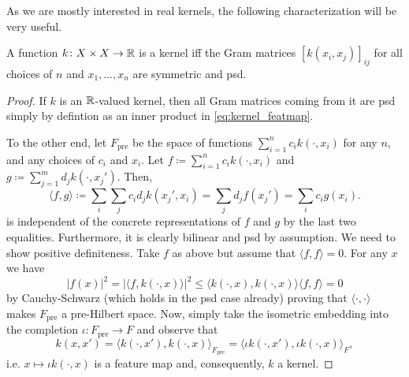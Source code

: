 As we are mostly interested in real kernels, the following 
characterization will be very useful.

\begin{lemma}
    A function $k \colon X \times X \to \mathbb{R}$ is a kernel 
    iff the Gram matrices $[k(x_i,x_j)]_{ij}$ 
    for all choices of $n$ and $x_1, \dots, x_n$
    are symmetric and psd.
\end{lemma}
\begin{proof}
    If $k$ is an $\mathbb{R}$-valued kernel, then all Gram matrices
    coming from it are psd simply by defintion as an inner 
    product in \cref{eq:kernel_featmap}.

    To the other end, let $F_{\textrm{pre}}$ be the
    space of functions $\sum_{i=1}^n c_i k(\cdot,x_i)$ for 
    any $n$, and any choices of $c_i$ and $x_i$.
    Let $f \coloneqq \sum_{i=1}^n c_i k(\cdot,x_i)$ and
    $g \coloneqq \sum_{j=1}^m d_j k(\cdot,x_j')$.
    Then, 
    \begin{equation*}
        \langle f,g \rangle \coloneqq 
            \sum_i \sum_j c_i d_j k(x_j', x_i)
            = \sum_j d_j f(x_j') = \sum_i c_i g(x_i).
    \end{equation*}
    is independent of the concrete representations of $f$ 
    and $g$ by the last two equalities.
    Furthermore, it is clearly bilinear and psd by assumption.
    We need to show positive definiteness. 
    Take $f$ as above but assume that $\langle f,f \rangle = 0$.
    For any $x$ we have 
    \begin{equation} \label{eq:firstreprprop}
        |f(x)|^2 = | \langle f, k(\cdot,x) \rangle |^2
            \leq \langle k(\cdot,x),k(\cdot,x) \rangle
            \langle f,f \rangle = 0
    \end{equation}
    by Cauchy-Schwarz (which holds in the psd case already) 
    proving that $\langle \cdot, \cdot \rangle$ makes 
    $F_{\textrm{pre}}$ a pre-Hilbert space.
    Now, simply take the isometric embedding into the completion 
    $\iota \colon F_{\textrm{pre}} \to F$
    and observe that
    \begin{equation*}
        k(x,x') = 
            \langle k(\cdot,x'), k(\cdot,x) \rangle_{F_{\textrm{pre}}}
            = \langle \iota k(\cdot,x'), \iota k(\cdot,x) \rangle_F,
    \end{equation*}
    i.e. $x \mapsto \iota k(\cdot,x)$ is a feature map and, 
    consequently, $k$ a kernel.
\end{proof}

